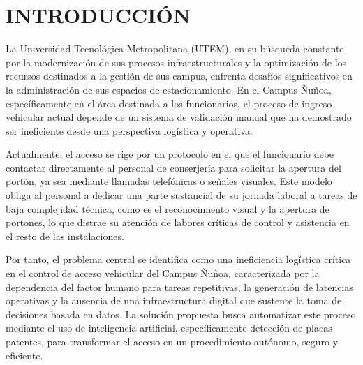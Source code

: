 %

\chapter*{INTRODUCCIÓN}

La Universidad Tecnológica Metropolitana (UTEM), en su búsqueda constante por la modernización de sus procesos infraestructurales y la optimización de los recursos destinados a la gestión de sus campus, enfrenta desafíos significativos en la administración de sus espacios de estacionamiento. En el Campus Ñuñoa, específicamente en el área destinada a los funcionarios, el proceso de ingreso vehicular actual depende de un sistema de validación manual que ha demostrado ser ineficiente desde una perspectiva logística y operativa.

Actualmente, el acceso se rige por un protocolo en el que el funcionario debe contactar directamente al personal de conserjería para solicitar la apertura del portón, ya sea mediante llamadas telefónicas o señales visuales. Este modelo obliga al personal a dedicar una parte sustancial de su jornada laboral a tareas de baja complejidad técnica, como es el reconocimiento visual y la apertura de portones, lo que distrae su atención de labores críticas de control y asistencia en el resto de las instalaciones.

Por tanto, el problema central se identifica como una ineficiencia logística crítica en el control de acceso vehicular del Campus Ñuñoa, caracterizada por la dependencia del factor humano para tareas repetitivas, la generación de latencias operativas y la ausencia de una infraestructura digital que sustente la toma de decisiones basada en datos. La solución propuesta busca automatizar este proceso mediante el uso de inteligencia artificial, específicamente detección de placas patentes, para transformar el acceso en un procedimiento autónomo, seguro y eficiente.

